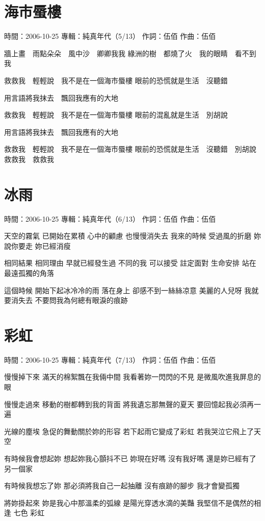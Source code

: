 \documentclass[UTF8,a4paper,oneside,twocolumn,12pt]{ctexbook}
\newcommand{\infopair}[2]{\textbullet #1：#2}
\newcommand{\zc}[1][伍佰]{\infopair{作詞}{#1}}
\newcommand{\zq}[1][伍佰]{\infopair{作曲}{#1}}
\newcommand{\zj}[1]{\infopair{專輯}{#1}}
\newcommand{\sj}[1]{\infopair{時間}{#1}}
\newenvironment{info}{\begin{flushleft}\kaishu
	}
	{\end{flushleft}\normalsize\yahei\par}
\newenvironment{lyric}{
	}
{}
\begin{document}
\section{海市蜃樓}
\begin{info}
	\sj{2006-10-25}
	\zj{純真年代（5/13）}
	\zc
	\zq
\end{info}
\begin{lyric}
	牆上畫　雨點朵朵　風中沙　卿卿我我
	綠洲的樹　都燒了火　我的眼睛　看不到我

	救救我　輕輕說　我不是在一個海市蜃樓
	眼前的恐慌就是生活　沒聽錯

	用言語將我抹去　飄回我應有的大地

	救救我　輕輕說　我不是在一個海市蜃樓
	眼前的混亂就是生活　別胡說

	用言語將我抹去　飄回我應有的大地

	救救我　輕輕說　我不是在一個海市蜃樓
	眼前的恐慌就是生活　沒聽錯　別胡說　救救我　救救我
\end{lyric}

\section{冰雨}
\begin{info}
	\sj{2006-10-25}
	\zj{純真年代（6/13）}
	\zc
	\zq
\end{info}
\begin{lyric}
	天空的霧氣 已開始在累積
	心中的顧慮 也慢慢消失去
	我來的時候 受過風的折磨
	妳說你要走 妳已經消瘦

	相同結果 相同理由 早就已經發生過
	不同的我 可以接受 註定面對 生命安排
	站在最遠孤獨的角落

	這個時候 開始下起冰冷冷的雨
	落在身上 卻感不到一絲絲凉意
	美麗的人兒呀 我就要消失去
	不要問我為何總有眼淚的痕跡
\end{lyric}

\section{彩虹}
\begin{info}
	\sj{2006-10-25}
	\zj{純真年代（7/13）}
	\zc
	\zq
\end{info}
\begin{lyric}
	慢慢掉下來 滿天的棉絮飄在我倆中間
	我看著妳一閃閃的不見 是微風吹進我屏息的眼

	慢慢走過來 移動的樹都轉到我的背面
	將我遺忘那無聲的夏天 要回憶起我必須再一遍

	光線的塵埃 急促的舞動關於妳的形容
	若下起雨它變成了彩虹 若我哭泣它飛上了天空

	有時候我會想起妳 想起妳我心顫抖不已
	妳現在好嗎 沒有我好嗎 還是妳已經有了另一個家

	有時候我想忘了妳 那必須將我自己一起抽離
	沒有痕跡的腳步 我才會變孤獨

	將妳掛起來 妳是我心中那溫柔的弧線
	是陽光穿透水滴的美豔 我堅信不是偶然的相逢 七色 彩虹
\end{lyric}
\end{document}
